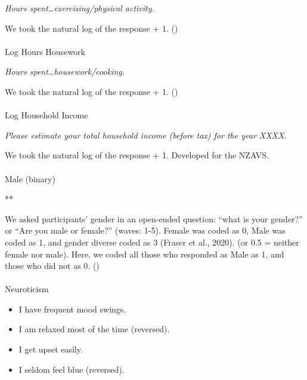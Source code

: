 \documentclass[
  single column]{article}
\makeatletter
\let\oldparagraph\paragraph
\renewcommand{\paragraph}{
    \@ifstar
      \xxxParagraphStar
      \xxxParagraphNoStar
  }
\newcommand{\xxxParagraphStar}[1]{\oldparagraph*{#1}\mbox{}}
\newcommand{\xxxParagraphNoStar}[1]{\oldparagraph{#1}\mbox{}}
\providecommand{\tightlist}{%
  \setlength{\itemsep}{0pt}\setlength{\parskip}{0pt}}\usepackage{longtable,booktabs,array}
\makeatother
\begin{document}
\emph{Hours spent\ldots exercising/physical activity.}

We took the natural log of the response + 1.
()

\paragraph{Log Hours Housework}\label{log-hours-housework}

\emph{Hours spent\ldots housework/cooking.}

We took the natural log of the response + 1.
()

\paragraph{Log Household Income}\label{log-household-income}

\emph{Please estimate your total household income (before tax) for the
year XXXX.}

We took the natural log of the response + 1. Developed for the NZAVS.

\paragraph{Male (binary)}\label{male-binary}

**

We asked participants' gender in an open-ended question: ``what is your
gender?'' or ``Are you male or female?'' (waves: 1-5). Female was coded
as 0, Male was coded as 1, and gender diverse coded as 3 (Fraser et al.,
2020). (or 0.5 = neither female nor male). Here, we coded all those who
responded as Male as 1, and those who did not as 0.
()

\paragraph{Neuroticism}\label{neuroticism}

\begin{itemize}
\tightlist
\item
  I have frequent mood swings.
\item
  I am relaxed most of the time (reversed).
\item
  I get upset easily.
\item
  I seldom feel blue (reversed).
\end{itemize}
\end{document}
